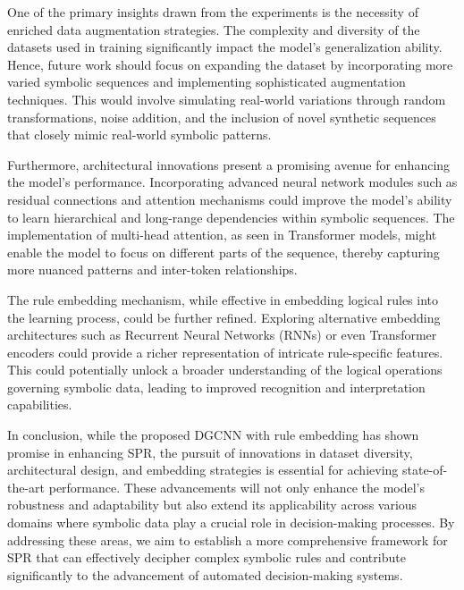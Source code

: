 \documentclass{article}
\begin{document}
One of the primary insights drawn from the experiments is the necessity of enriched data augmentation strategies. The complexity and diversity of the datasets used in training significantly impact the model's generalization ability. Hence, future work should focus on expanding the dataset by incorporating more varied symbolic sequences and implementing sophisticated augmentation techniques. This would involve simulating real-world variations through random transformations, noise addition, and the inclusion of novel synthetic sequences that closely mimic real-world symbolic patterns.

Furthermore, architectural innovations present a promising avenue for enhancing the model's performance. Incorporating advanced neural network modules such as residual connections and attention mechanisms could improve the model's ability to learn hierarchical and long-range dependencies within symbolic sequences. The implementation of multi-head attention, as seen in Transformer models, might enable the model to focus on different parts of the sequence, thereby capturing more nuanced patterns and inter-token relationships.

The rule embedding mechanism, while effective in embedding logical rules into the learning process, could be further refined. Exploring alternative embedding architectures such as Recurrent Neural Networks (RNNs) or even Transformer encoders could provide a richer representation of intricate rule-specific features. This could potentially unlock a broader understanding of the logical operations governing symbolic data, leading to improved recognition and interpretation capabilities.

In conclusion, while the proposed DGCNN with rule embedding has shown promise in enhancing SPR, the pursuit of innovations in dataset diversity, architectural design, and embedding strategies is essential for achieving state-of-the-art performance. These advancements will not only enhance the model's robustness and adaptability but also extend its applicability across various domains where symbolic data play a crucial role in decision-making processes. By addressing these areas, we aim to establish a more comprehensive framework for SPR that can effectively decipher complex symbolic rules and contribute significantly to the advancement of automated decision-making systems.
\end{document}

